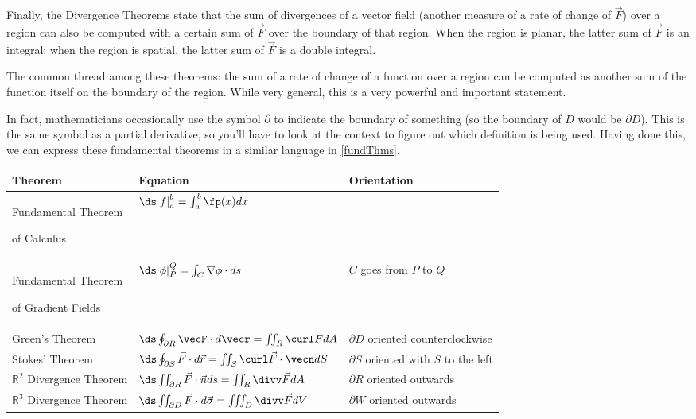 Finally, the Divergence Theorems state that the sum of divergences of a vector field (another measure of a rate of change of $\vec F$) over a region can also be computed with a certain sum of $\vec F$ over the boundary of that region. When the region is planar, the latter sum of $\vec F$ is an integral; when the region is spatial, the latter sum of $\vec F$ is a double integral.

The common thread among these theorems: the sum of a rate of change of a function over a region can be computed as another sum of the function itself on the boundary of the region. While very general, this is a very powerful and important statement.


In fact, mathematicians occasionally use the symbol $\partial$ to indicate the boundary of something (so the boundary of $D$ would be $\partial D$).  This is the same symbol as a partial derivative, so you'll have to look at the context to figure out which definition is being used.  Having done this, we can express these fundamental theorems in a similar language in \autoref{fundThms}.


{
\begin{keyidea}\label{fundThms}
\renewcommand{\arraystretch}{1.4}
 \begin{tabular}{p{10em} l l}
  Theorem & Equation & Orientation \\\midrule
  Fundamental Theorem\par of Calculus & $\ds\left.f\right|_a^b=\int_a^b \fp(x)d x$ &\\
  Fundamental Theorem\par of Gradient Fields & $\ds\left.\phi\right|_P^Q=\int_C\nabla\phi\cdot d s$ & $C$ goes from $P$ to $Q$ \\
  Green's Theorem & $\ds\oint_{\partial R}\vecF\cdot d\vecr=\iint_R\curl F d A$ & $\partial D$ oriented counterclockwise \medskip\\
  Stokes' Theorem & $\ds\oint_{\partial S}\vec F\cdot d\vec r=\iint_S\curl\vec F\cdot \vecn dS$ & $\partial S$ oriented with $S$ to the left \medskip\\
  $\mathbb{R}^2$ Divergence Theorem & $\ds\iint_{\partial R}\vec F\cdot\vec n d s=\iint_R\divv\vec Fd A$ & $\partial R$ oriented outwards \medskip\\
  $\mathbb{R}^3$ Divergence Theorem & $\ds\iint_{\partial D}\vec F\cdot d \vec\sigma=\iiint_D\divv\vec Fd V$ & $\partial W$ oriented outwards
 \end{tabular}
\end{keyidea}
}

